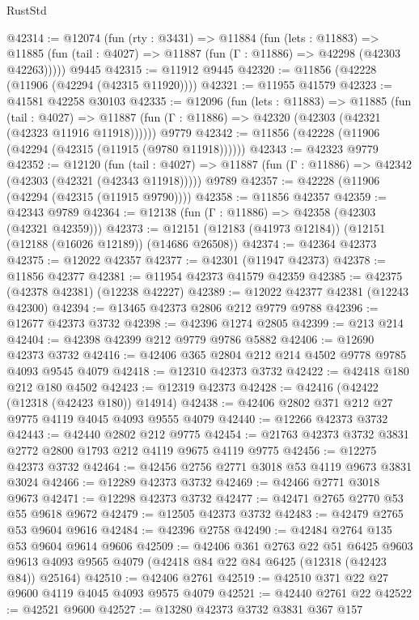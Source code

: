 \begin{lexlean}{RustStd}
\begin{coremodule}
@42314 := @12074
    (fun (rty : @3431) =>
    @11884
      (fun (lets : @11883) =>
      @11885 (fun (tail : @4027) => @11887 (fun (Γ : @11886) => @42298 (@42303 @42263)))))
    @9445
@42315 := @11912 @9445
@42320 := @11856 (@42228 (@11906 (@42294 (@42315 @11920))))
@42321 := @11955 @41579
@42323 := @41581 @42258 @30103
@42335 := @12096
    (fun (lets : @11883) =>
    @11885
      (fun (tail : @4027) =>
      @11887 (fun (Γ : @11886) => @42320 (@42303 (@42321 (@42323 @11916 @11918))))))
    @9779
@42342 := @11856 (@42228 (@11906 (@42294 (@42315 (@11915 (@9780 @11918))))))
@42343 := @42323 @9779
@42352 := @12120
    (fun (tail : @4027) => @11887 (fun (Γ : @11886) => @42342 (@42303 (@42321 (@42343 @11918)))))
    @9789
@42357 := @42228 (@11906 (@42294 (@42315 (@11915 @9790))))
@42358 := @11856 @42357
@42359 := @42343 @9789
@42364 := @12138 (fun (Γ : @11886) => @42358 (@42303 (@42321 @42359)))
@42373 := @12151 (@12183 (@41973 @12184)) (@12151 (@12188 (@16026 @12189)) (@14686 @26508))
@42374 := @42364 @42373
@42375 := @12022 @42357
@42377 := @42301 (@11947 @42373)
@42378 := @11856 @42377
@42381 := @11954 @42373 @41579 @42359
@42385 := @42375 (@42378 @42381) (@12238 @42227)
@42389 := @12022 @42377 @42381 (@12243 @42300)
@42394 := @13465 @42373 @2806 @212 @9779 @9788
@42396 := @12677 @42373 @3732
@42398 := @42396 @1274 @2805
@42399 := @213 @214
@42404 := @42398 @42399 @212 @9779 @9786 @5882
@42406 := @12690 @42373 @3732
@42416 := @42406 @365 @2804 @212 @214 @4502 @9778 @9785 @4093 @9545 @4079
@42418 := @12310 @42373 @3732
@42422 := @42418 @180 @212 @180 @4502
@42423 := @12319 @42373
@42428 := @42416 (@42422 (@12318 (@42423 @180)) @14914)
@42438 := @42406 @2802 @371 @212 @27 @9775 @4119 @4045 @4093 @9555 @4079
@42440 := @12266 @42373 @3732
@42443 := @42440 @2802 @212 @9775
@42454 := @21763 @42373 @3732 @3831 @2772 @2800 @1793 @212 @4119 @9675 @4119 @9775
@42456 := @12275 @42373 @3732
@42464 := @42456 @2756 @2771 @3018 @53 @4119 @9673 @3831 @3024
@42466 := @12289 @42373 @3732
@42469 := @42466 @2771 @3018 @9673
@42471 := @12298 @42373 @3732
@42477 := @42471 @2765 @2770 @53 @55 @9618 @9672
@42479 := @12505 @42373 @3732
@42483 := @42479 @2765 @53 @9604 @9616
@42484 := @42396 @2758
@42490 := @42484 @2764 @135 @53 @9604 @9614 @9606
@42509 := @42406
    @361
    @2763
    @22
    @51
    @6425
    @9603
    @9613
    @4093
    @9565
    @4079
    (@42418 @84 @22 @84 @6425 (@12318 (@42423 @84)) @25164)
@42510 := @42406 @2761
@42519 := @42510 @371 @22 @27 @9600 @4119 @4045 @4093 @9575 @4079
@42521 := @42440 @2761 @22
@42522 := @42521 @9600
@42527 := @13280 @42373 @3732 @3831 @367 @157

\end{coremodule}
\end{lexlean}
